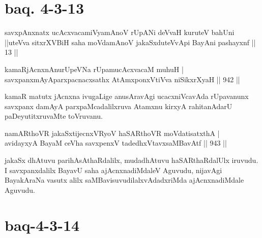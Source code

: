 \section*{baq. 4-3-13}

\begin{shl}
savxpAnxnatx ucAcxvacamiVyamAnoV rUpANi deVvaH kuruteV bahUni ||uteVva sitxrXVBiH saha moVdamAnoV jakaSxduteVvApi BayAni pashayxnf || 13 ||
\end{shl}


\begin{shl}
kamaRjAcnxnAnurUpeVNa rUpamucAcxvacaM muhuH | \\
savxpanxmAyAparxpacnacxsathx AtAmx\s \s ponxVtiVva niSikxrXyaH \hfill||  942 ||  
\end{shl}

\begin{artha}
kamaR matutx jAcnxna ivugaLige anusAravAgi ucacxniVcavAda rUpavanunx savxpanx damAyA parxpaMcadalilxruva Atamxnu kirxyA rahitanAdarU paDeyutitxruvaMte toVruvanu.
\end{artha}


\begin{shl}
namARthoVR \footnotemark[1]jakaSxtijecnxVRyoV haSARthoVR moVdatisatxthA | \\
avidayxyA BayaM ceVha savxpenxV tadedhxVtavxsaMBavAtf \hfill||  943 ||  
\end{shl}

\begin{artha}
jakaSx dhAtuvu parihAsAthaRdalilx, mudadhAtuvu haSARthaRdalUlx iruvudu. I savxpanxdalilx BayavU saha ajAcnxnadiMdaleV Aguvudu, nijavAgi BayakAraNa vasutx alilx saMBavisuvudilalxvAdadxriMda ajAcnxnadiMdale Aguvudu.
\end{artha}

\section*{baq-4-3-14}

